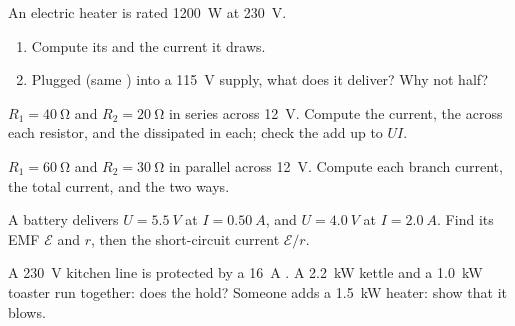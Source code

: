 \begin{exercise}[$\star\star$]\label{exo:g11:circuits-and-power:6}
An electric heater is rated \qty{1200}{W} at \qty{230}{V}.
\begin{enumerate}
  \item Compute its  and the current it draws.
  \item Plugged (same ) into a \qty{115}{V} supply, what 
        does it deliver? Why not half?
\end{enumerate}
\end{exercise}

\begin{exercise}[$\star\star$]\label{exo:g11:circuits-and-power:7}
$R_1 = \qty{40}{\ohm}$ and $R_2 = \qty{20}{\ohm}$ in series across
\qty{12}{V}. Compute the current, the  across each resistor, and
the  dissipated in each; check the  add up to $UI$.
\end{exercise}

\begin{exercise}[$\star\star$]\label{exo:g11:circuits-and-power:8}
$R_1 = \qty{60}{\ohm}$ and $R_2 = \qty{30}{\ohm}$ in parallel across
\qty{12}{V}. Compute each branch current, the total current, and the
 two ways.
\end{exercise}

\begin{exercise}[$\star\star$]\label{exo:g11:circuits-and-power:9}
A battery delivers $U = \qty{5.5}{V}$ at $I = \qty{0.50}{A}$, and
$U = \qty{4.0}{V}$ at $I = \qty{2.0}{A}$. Find its EMF $\mathcal{E}$ and
 $r$, then the short-circuit current $\mathcal{E}/r$.
\end{exercise}

\begin{exercise}[$\star\star$]\label{exo:g11:circuits-and-power:10}
A \qty{230}{V} kitchen line is protected by a \qty{16}{A} . A
\qty{2.2}{kW} kettle and a \qty{1.0}{kW} toaster run together: does the
 hold? Someone adds a \qty{1.5}{kW} heater: show that it blows.
\end{exercise}

